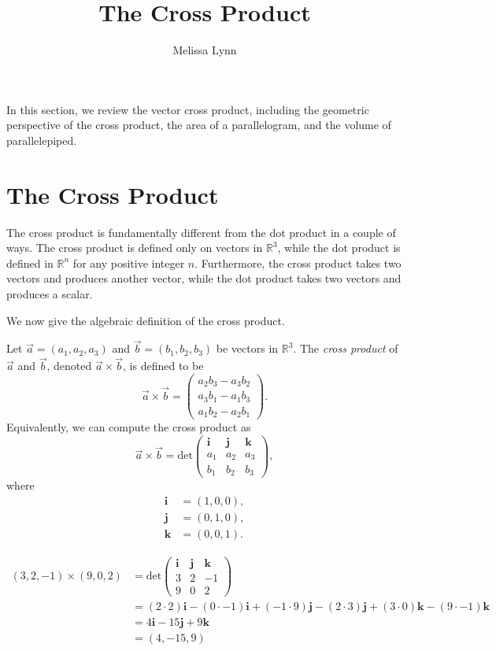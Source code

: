 \documentclass{ximera}
\title{The Cross Product}
\author{Melissa Lynn}
\begin{document}
  
\begin{abstract}  
\end{abstract}  
\maketitle 

In this section, we review the vector cross product, including the geometric perspective of the cross product, the area of a parallelogram, and the volume of parallelepiped.

\section*{The Cross Product}

The cross product is fundamentally different from the dot product in a couple of ways. The cross product is defined only on vectors in $\mathbb{R}^3$, while the dot product is defined in $\mathbb{R}^n$ for any positive integer $n$. Furthermore, the cross product takes two vectors and produces another vector, while the dot product takes two vectors and produces a scalar.

We now give the algebraic definition of the cross product.

\begin{definition}
Let $\vec{a}=(a_1,a_2,a_3)$ and $\vec{b}=(b_1,b_2,b_3)$ be vectors in $\mathbb{R}^3$. The \emph{cross product} of $\vec{a}$ and $\vec{b}$, denoted $\vec{a}\times\vec{b}$, is defined to be
\[
\vec{a}\times\vec{b}=\left(\begin{array}{c}a_2b_3-a_3b_2\\a_3b_1-a_1b_3\\a_1b_2-a_2b_1\end{array}\right).
\]
Equivalently, we can compute the cross product as
\[
\vec{a}\times\vec{b}=\textrm{det}\left(\begin{array}{ccc}\mathbf{i}&\mathbf{j}&\mathbf{k}\\a_1&a_2&a_3\\b_1&b_2&b_3\end{array}\right),
\]
where
\begin{align*}
\mathbf{i}&=(1,0,0),\\
\mathbf{j}&=(0,1,0),\\
\mathbf{k}&=(0,0,1).
\end{align*}
\end{definition}

\begin{example}
\begin{align*}
(3,2,-1)\times(9,0,2) &= \textrm{det}\left(\begin{array}{ccc}\textbf{i}&\textbf{j}&\textbf{k}\\3&2&-1\\9&0&2\end{array}\right)\\
&= (2\cdot 2)\mathbf{i} - (0\cdot -1)\mathbf{i} + (-1\cdot 9)\mathbf{j} - (2\cdot 3)\mathbf{j}+(3\cdot 0)\mathbf{k} - (9\cdot -1)\mathbf{k}\\
&= 4\mathbf{i}-15\mathbf{j}+9\mathbf{k}\\
&= (4,-15, 9)
\end{align*}
\end{example}
\end{document}
